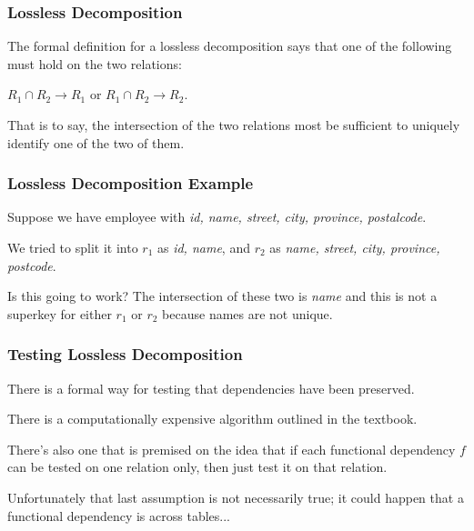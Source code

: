 \begin{frame}
\frametitle{Lossless Decomposition}

The formal definition for a lossless decomposition says that one of the following must hold on the two relations: 

$R_{1} \cap R_{2} \rightarrow R_{1}$ or  $R_{1} \cap R_{2} \rightarrow R_{2}$. 

That is to say, the intersection of the two relations most be sufficient to uniquely identify one of the two of them. 

\end{frame}



\begin{frame}
\frametitle{Lossless Decomposition Example}

Suppose we have employee with \textit{id, name, street, city, province, postalcode}.

We tried to split it into $r_{1}$ as \textit{id, name}, and $r_{2}$ as \textit{name, street, city, province, postcode}. 

Is this going to work? The intersection of these two is \textit{name} and this is not a superkey for either $r_{1}$ or $r_{2}$ because names are not unique.

\end{frame}



\begin{frame}
\frametitle{Testing Lossless Decomposition}

There is a formal way for testing that dependencies have been preserved. 

There is a computationally expensive algorithm outlined in the textbook. 

There's also one that is premised on the idea that if each functional dependency $f$ can be tested on one relation only, then just test it on that relation. 

Unfortunately that last assumption is not necessarily true; it could happen that a functional dependency is across tables...

\end{frame}


